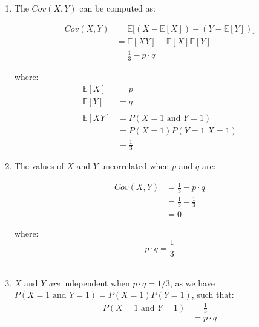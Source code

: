 \documentclass{article}
\begin{document}
\begin{enumerate}
    \begin{enumerate}
        \item The $Cov(X, Y)$ can be computed as:

        \begin{equation}
            \begin{split}
                Cov(X,Y) &= \mathbb{E}{\big[(X-\mathbb{E}{[X]}) - (Y-\mathbb{E}{[Y]})\big]}\\
                &= \mathbb{E}{[XY]} - \mathbb{E}{[X]}\mathbb{E}{[Y]}\\
                &= \frac{1}{3} - p \cdot q
            \end{split}
        \end{equation}

        where:
        \begin{equation}
            \begin{split}
                \mathbb{E}{[X]} &= p\\
                \mathbb{E}{[Y]} &= q\\~\\
                \mathbb{E}{[XY]} &= P(X = 1 \text{ and } Y = 1)\\
                &= P(X=1) P(Y = 1|X = 1)\\
                &= \frac{1}{3}
            \end{split}
        \end{equation}
        
        \item The values of $X$ and $Y$ uncorrelated when $p$ and $q$ are:

        \begin{equation}
            \begin{split}
                Cov(X,Y) &= \frac{1}{3} - p \cdot q\\
                &= \frac{1}{3} - \frac{1}{3}\\
                &= 0
            \end{split}
        \end{equation}

        where:
        \begin{equation}
            p \cdot q = \frac{1}{3}
        \end{equation}\\

        \item $X$ and $Y$ \textit{are} independent when $p \cdot q = 1/3$, as we have $P(X=1 \text{ and } Y=1) = P(X=1) P(Y=1)$, such that:
        \begin{equation}
        \begin{split}
            P(X=1 \text{ and } Y=1) &= \frac{1}{3}\\
            &= p \cdot q
        \end{split}
        \end{equation}
    \end{enumerate}
    
\end{enumerate}
\end{document}
